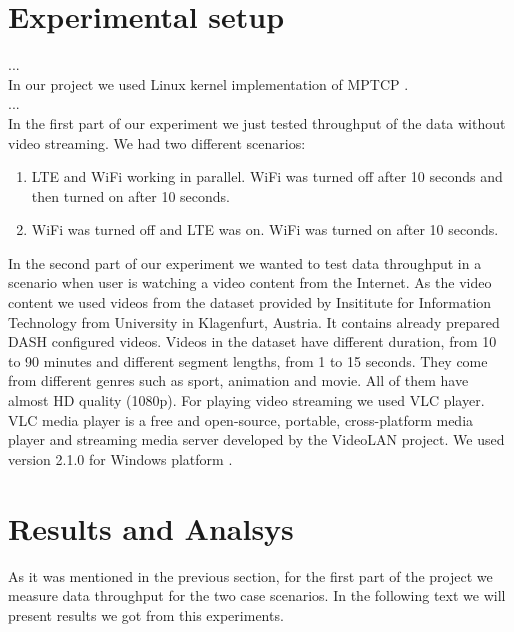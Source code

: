 \documentclass{llncs}
\begin{document}
\section{Experimental setup}
... 
\\
In our project we used Linux kernel implementation of MPTCP \cite{linuxMPTCP}. 
\\
...
\\
In the first part of our experiment we just tested throughput of the data without video streaming. We had two different scenarios:

\begin{enumerate}
\item{LTE and WiFi working in parallel. WiFi was turned off after 10 seconds and then turned on after 10 seconds.}
\item{WiFi was turned off and LTE was on. WiFi was turned on after 10 seconds.}
\end{enumerate}

In the second part of our experiment we wanted to test data throughput in a scenario when user is watching a video content from the Internet. As the video content we used videos from the dataset  \cite{dataset} provided by Insititute for Information Technology from University in Klagenfurt, Austria. It contains already prepared DASH configured videos. Videos in the dataset have different duration, from 10 to 90 minutes and different segment lengths, from 1 to 15 seconds. They come from different genres such as sport, animation and movie. All of them have almost HD quality (1080p).  For playing video streaming we used VLC player. VLC media player is a free and open-source, portable, cross-platform media player and streaming media server developed by the VideoLAN project. We used version 2.1.0 for Windows platform \cite{VLC}. 

\section{Results and Analsys}
As it was mentioned in the previous section, for the first part of the project we measure data throughput for the two case scenarios. In the following text we will present results we got from this experiments.
\end{document}
